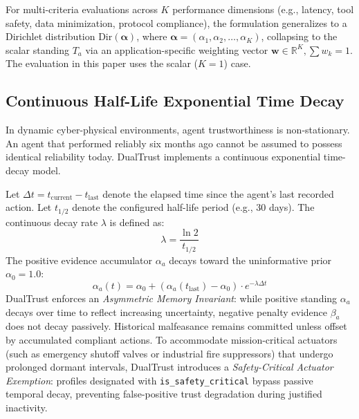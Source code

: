 \documentclass[journal]{IEEEtran}
\begin{document}
For multi-criteria evaluations across $K$ performance dimensions (e.g., latency, tool safety, data minimization, protocol compliance), the formulation generalizes to a Dirichlet distribution $\text{Dir}(\boldsymbol{\alpha})$, where $\boldsymbol{\alpha} = (\alpha_1, \alpha_2, \dots, \alpha_K)$, collapsing to the scalar standing $T_a$ via an application-specific weighting vector $\mathbf{w} \in \mathbb{R}^K, \sum w_k = 1$. The evaluation in this paper uses the scalar ($K=1$) case.

\subsection{Continuous Half-Life Exponential Time Decay}
In dynamic cyber-physical environments, agent trustworthiness is non-stationary. An agent that performed reliably six months ago cannot be assumed to possess identical reliability today. DualTrust implements a continuous exponential time-decay model.

Let $\Delta t = t_{\text{current}} - t_{\text{last}}$ denote the elapsed time since the agent's last recorded action. Let $t_{1/2}$ denote the configured half-life period (e.g., 30 days). The continuous decay rate $\lambda$ is defined as:
\begin{equation}
\lambda = \frac{\ln 2}{t_{1/2}}
\end{equation}
The positive evidence accumulator $\alpha_a$ decays toward the uninformative prior $\alpha_0 = 1.0$:
\begin{equation}
\alpha_a(t) = \alpha_0 + (\alpha_a(t_{\text{last}}) - \alpha_0) \cdot e^{-\lambda \Delta t}
\label{eq:decay}
\end{equation}
DualTrust enforces an \emph{Asymmetric Memory Invariant}: while positive standing $\alpha_a$ decays over time to reflect increasing uncertainty, negative penalty evidence $\beta_a$ does not decay passively. Historical malfeasance remains committed unless offset by accumulated compliant actions. To accommodate mission-critical actuators (such as emergency shutoff valves or industrial fire suppressors) that undergo prolonged dormant intervals, DualTrust introduces a \emph{Safety-Critical Actuator Exemption}: profiles designated with \texttt{is\_safety\_critical} bypass passive temporal decay, preventing false-positive trust degradation during justified inactivity.
\end{document}

